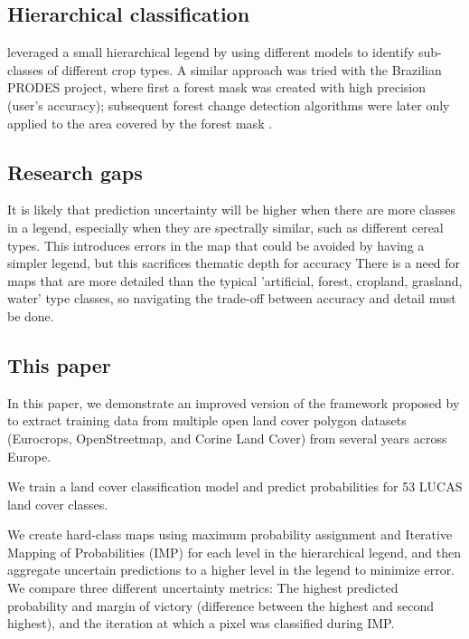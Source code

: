     \subsection{Hierarchical classification}
        \citet{kim2016modis} leveraged a small hierarchical legend by using different models to identify sub-classes of different crop types. A similar approach was tried with the Brazilian PRODES project, where first a forest mask was created with high precision (user's accuracy); subsequent forest change detection algorithms were later only applied to the area covered by the forest mask \citep{hansen2008comparing}.

    \subsection{Research gaps}
        It is likely that prediction uncertainty will be higher when there are more classes in a legend, especially when they are spectrally similar, such as different cereal types. This introduces errors in the map that could be avoided by having a simpler legend, but this sacrifices thematic depth for accuracy There is a need for maps that are more detailed than the typical 'artificial, forest, cropland, grasland, water' type classes, so navigating the trade-off between accuracy and detail must be done.

    \subsection{This paper}
        In this paper, we demonstrate an improved version of the framework proposed by \citep{witjes2022spatiotemporal} to extract training data from multiple open land cover polygon datasets (Eurocrops, OpenStreetmap, and Corine Land Cover) from several years across Europe. 
        
        We train a land cover classification model and predict probabilities for 53 LUCAS land cover classes.
        
        We create hard-class maps using maximum probability assignment and Iterative Mapping of Probabilities (IMP) \citep{witjes2024iterative} for each level in the hierarchical legend, and then aggregate uncertain predictions to a higher level in the legend to minimize error. We compare three different uncertainty metrics: The highest predicted probability and margin of victory (difference between the highest and second highest), and the iteration at which a pixel was classified during IMP.
        
